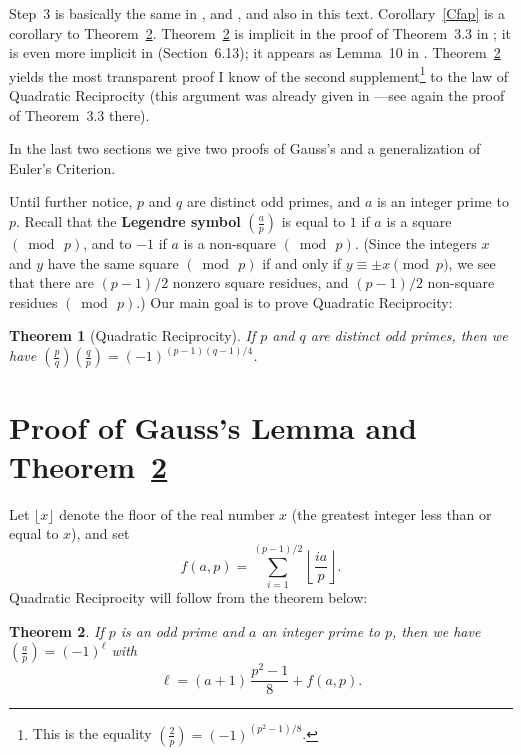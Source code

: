 \documentclass[12pt,letterpaper]{article}
\newtheorem{thm}{Theorem}%
\begin{document}
Step~3 is basically the same in \cite{hardy2008introduction}, \cite{niven1991introduction} and \cite{wallach}, and also in this text. Corollary~\ref{Cfap} is a corollary to Theorem~\ref{Tmain}. Theorem~\ref{Tmain} is implicit in the proof of Theorem~3.3 in \cite{niven1991introduction}; it is even more implicit in \cite{hardy2008introduction} (Section~6.13); it appears as Lemma~10 in \cite{wallach}. Theorem~\ref{Tmain} yields the most transparent proof I know of the second supplement\footnote{This is the equality \((\frac2p)=(-1)^{(p^2-1)/8}\).} to the law of Quadratic Reciprocity (this argument was already given in \cite{niven1991introduction}---see again the proof of Theorem~3.3 there). 

In the last two sections we give two proofs of Gauss's and a generalization of Euler's Criterion. 

Until further notice, \(p\) and \(q\) are distinct odd primes, and \(a\) is an integer prime to \(p\). Recall that the \textbf{Legendre symbol} \((\frac ap)\) is equal to \(1\) if \(a\) is a square \((\bmod\,p)\), and to \(-1\) if \(a\) is a non-square \((\bmod\,p)\). (Since the integers \(x\) and \(y\) have the same square \((\bmod\,p)\) if and only if \(y\equiv\pm x\pmod{p}\), we see that there are \((p-1)/2\) nonzero square residues, and \((p-1)/2\) non-square residues \((\bmod\,p)\).) Our main goal is to prove Quadratic Reciprocity: 

\begin{thm}[Quadratic Reciprocity]\label{TQR} 
If \(p\) and \(q\) are distinct odd primes, then we have \((\frac pq)(\frac qp)=(-1)^{(p-1)(q-1)/4}\). 
\end{thm} 

\section{Proof of Gauss's Lemma and Theorem~\ref{Tmain}}%

Let $\lfloor x\rfloor$ denote the floor of the real number $x$ (the greatest integer less than or equal to $x$), and set 
\[
f(a,p)=\sum_{i=1}^{(p-1)/2}\left\lfloor\frac{ia}p\right\rfloor.
\] 
Quadratic Reciprocity will follow from the theorem below: 

\begin{thm}\label{Tmain} 
If \(p\) is an odd prime and \(a\) an integer prime to \(p\), then we have \((\frac ap)=(-1)^\ell\) with 
\[
\ell=(a+1)\,\frac{p^2-1}8+f(a,p).
\] 
\end{thm} 
\end{document}
